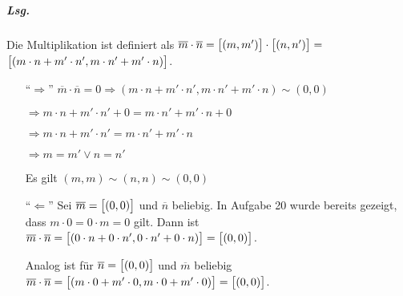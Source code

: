 \documentclass{scrreprt}
\begin{document}
\subparagraph{Lsg.}
Die Multiplikation ist definiert als
$\overline{m} \cdot \overline{n} = \qty\big[(m, m')] \cdot
\qty\big[(n, n')] =$ \\
$\qty\big[(m \cdot n + m' \cdot n', m \cdot n' + m' \cdot n)]$.
\begin{itemize}
\item[``$\Rightarrow$''] $\overline{m} \cdot \overline{n} = 0 \Rightarrow
  (m \cdot n + m' \cdot n', m \cdot n' + m' \cdot n) \sim (0, 0)$

  $\Rightarrow m \cdot n + m' \cdot n' + 0 =  m \cdot n' + m' \cdot n + 0$

  $\Rightarrow m \cdot n + m' \cdot n' = m \cdot n' + m' \cdot n$

  $\Rightarrow m = m' \lor n = n'$

  Es gilt $(m, m) \sim (n, n) \sim (0, 0)$

\item[``$\Leftarrow$''] Sei $\overline{m} = \qty\big[(0, 0)]$ und $\overline{n}$
  beliebig.
  In Aufgabe 20 wurde bereits gezeigt, dass $m \cdot 0 = 0 \cdot m = 0$ gilt.
  Dann ist $\overline{m} \cdot \overline{n} =
  \qty\big[(0 \cdot n + 0 \cdot n', 0 \cdot n' + 0 \cdot n)]
  = \qty\big[(0, 0)]$.

  Analog ist für $\overline{n} = \qty\big[(0, 0)]$ und $\overline{m}$ beliebig
  $\overline{m} \cdot \overline{n} =
  \qty\big[(m \cdot 0 + m' \cdot 0, m \cdot 0 + m' \cdot 0)]
  = \qty\big[(0, 0)]$.
\end{itemize}
\end{document}
